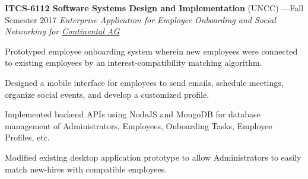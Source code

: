 \documentclass[12p4, letterpaper]{article}
\newenvironment{itemize*}
{\begin{itemize}\setlength{\itemsep}{0pt}}{\end{itemize}}
\newcommand{\rdate}[1]{{\addfontfeature{Numbers=OldStyle} \hfill \sffamily\footnotesize ---#1}}
\begin{document}
\textbf{ITCS-6112 Software Systems Design and Implementation} (UNCC) \rdate{Fall Semester 2017}\newline
\emph{Enterprise Application for Employee Onboarding and Social Networking for \href{https://www.continental-corporation.com/en}{Continental AG}}
\begin{itemize*}
	\item{Prototyped employee onboarding system wherein new employees were connected to existing employees by an interest-compatibility matching algorithm.}
	\item{Designed a mobile interface for employees to send emails, schedule meetings, organize social events, and develop a customized profile.}
	\item{Implemented backend APIs using NodeJS and MongoDB for database management of Administrators, Employees, Onboarding Tasks, Employee Profiles, etc.}
	\item{Modified existing desktop application prototype to allow Administrators to easily match new-hires with compatible employees.}
\end{itemize*}
\end{document}
